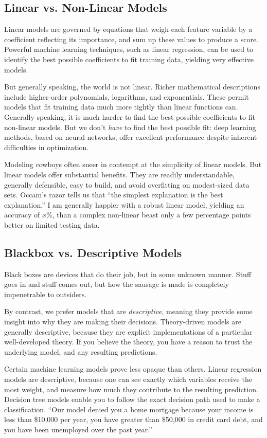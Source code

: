 \documentclass[10pt]{article}
\begin{document}
\subsection{Linear vs. Non-Linear Models}

Linear models are governed by equations that weigh each feature variable by a coefficient reflecting its importance, and sum up these values to produce a score. Powerful machine learning techniques, such as linear regression, can be used to identify the best possible coefficients to fit training data, yielding very effective models.

But generally speaking, the world is not linear. Richer mathematical descriptions include higher-order polynomials, logarithms, and exponentials. These permit models that fit training data much more tightly than linear functions can. Generally speaking, it is much harder to find the best possible coefficients to fit non-linear models. But we don’t \textit{have} to find the best possible fit: deep learning methods, based on neural networks, offer excellent performance despite inherent difficulties in optimization.

Modeling cowboys often sneer in contempt at the simplicity of linear models. But linear models offer substantial benefits. They are readily understandable, generally defensible, easy to build, and avoid overfitting on modest-sized data sets. Occam’s razor tells us that “the simplest explanation is the best explanation.” I am generally happier with a robust linear model, yielding an accuracy of \(x\%\), than a complex non-linear beast only a few percentage points better on limited testing data.

\subsection{Blackbox vs. Descriptive Models}

Black boxes are devices that do their job, but in some unknown manner. Stuff goes in and stuff comes out, but how the sausage is made is completely impenetrable to outsiders.

By contrast, we prefer models that are \textit{descriptive}, meaning they provide some insight into why they are making their decisions. Theory-driven models are generally descriptive, because they are explicit implementations of a particular well-developed theory. If you believe the theory, you have a reason to trust the underlying model, and any resulting predictions.

Certain machine learning models prove less opaque than others. Linear regression models are descriptive, because one can see exactly which variables receive the most weight, and measure how much they contribute to the resulting prediction. Decision tree models enable you to follow the exact decision path used to make a classification. “Our model denied you a home mortgage because your income is less than \$10,000 per year, you have greater than \$50,000 in credit card debt, and you have been unemployed over the past year.”
\end{document}
